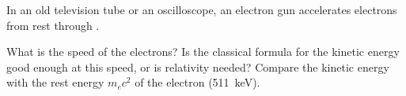 In an old television tube or an oscilloscope, an electron gun accelerates electrons from rest through \UO.

\begin{abcliste}
\abc What is the speed of the electrons?
\abc Is the classical formula for the kinetic energy good enough at this speed, or is relativity needed? Compare the kinetic energy with the rest energy $m_e c^2$ of the electron (\SI{511}{\kilo\electronvolt}).
\end{abcliste}
